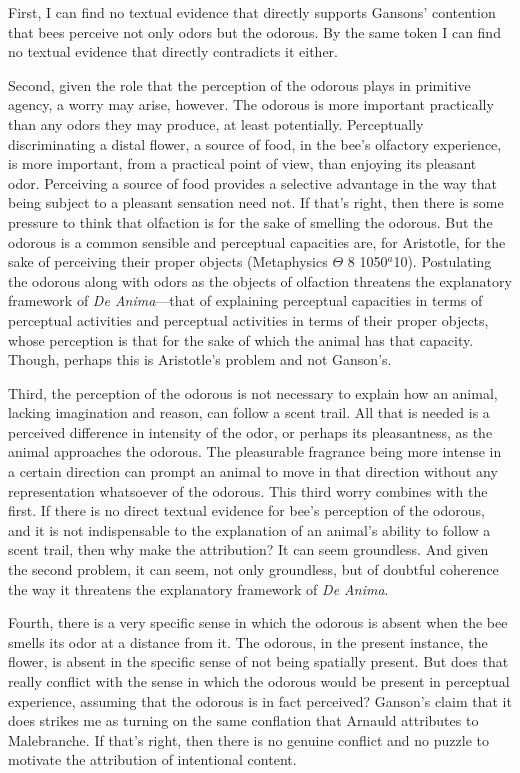 \documentclass[12pt]{article}
\begin{document}
First, I can find no textual evidence that directly supports Gansons' contention that bees perceive not only odors but the odorous. By the same token I can find no textual evidence that directly contradicts it either. 

Second, given the role that the perception of the odorous plays in primitive agency, a worry may arise, however. The odorous is more important practically than any odors they may produce, at least potentially. Perceptually discriminating a distal flower, a source of food, in the bee's olfactory experience, is more important, from a practical point of view, than enjoying its pleasant odor. Perceiving a source of food provides a selective advantage in the way that being subject to a pleasant sensation need not. If that's right, then there is some pressure to think that olfaction is for the sake of smelling the odorous. But the odorous is a common sensible and perceptual capacities are, for Aristotle, for the sake of perceiving their proper objects (Metaphysics \( \Theta \) 8 1050\( ^{a} \)10). Postulating the odorous along with odors as the objects of olfaction threatens the explanatory framework of \emph{De Anima}---that of explaining perceptual capacities in terms of perceptual activities and perceptual activities in terms of their proper objects, whose perception is that for the sake of which the animal has that capacity. Though, perhaps this is Aristotle's problem and not Ganson's.

Third, the perception of the odorous is not necessary to explain how an animal, lacking imagination and reason, can follow a scent trail. All that is needed is a perceived difference in intensity of the odor, or perhaps its pleasantness, as the animal approaches the odorous. The pleasurable fragrance being more intense in a certain direction can prompt an animal to move in that direction without any representation whatsoever of the odorous. This third worry combines with the first. If there is no direct textual evidence for bee's perception of the odorous, and it is not indispensable to the explanation of an animal's ability to follow a scent trail, then why make the attribution? It can seem groundless. And given the second problem, it can seem, not only groundless, but of doubtful coherence the way it threatens the explanatory framework of \emph{De Anima}.

Fourth, there is a very specific sense in which the odorous is absent when the bee smells its odor at a distance from it. The odorous, in the present instance, the flower, is absent in the specific sense of not being spatially present. But does that really conflict with the sense in which the odorous would be present in perceptual experience, assuming that the odorous is in fact perceived? Ganson's claim that it does strikes me as turning on the same conflation that Arnauld attributes to Malebranche. If that's right, then there is no genuine conflict and no puzzle to motivate the attribution of intentional content. 
\end{document}
